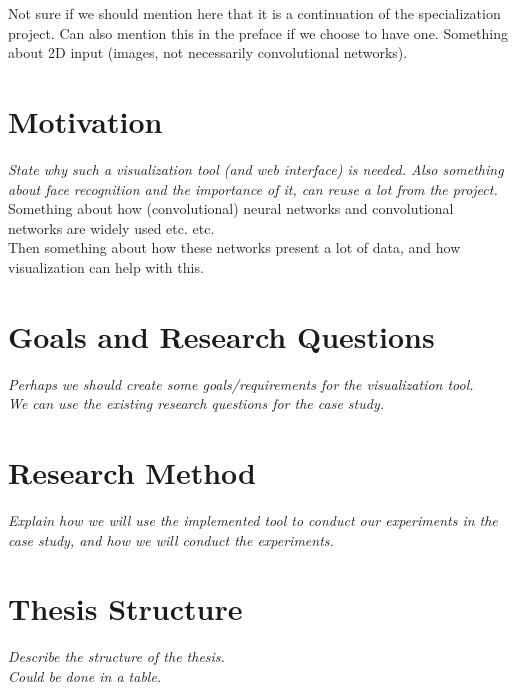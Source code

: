 \noindent Not sure if we should mention here that it is a continuation of the specialization project. Can also mention this in the preface if we choose to have one.
\noindent Something about 2D input (images, not necessarily convolutional networks).

\section{Motivation}

\textit{State why such a visualization tool (and web interface) is needed. Also something about face recognition and the importance of it, can reuse a lot from the project.} \\

\noindent Something about how (convolutional) neural networks and convolutional networks are widely used etc. etc. \\

\noindent Then something about how these networks present a lot of data, and how visualization can help with this.

\section{Goals and Research Questions}

\textit{Perhaps we should create some goals/requirements for the visualization tool. \\
We can use the existing research questions for the case study.}

\section{Research Method}

\textit{Explain how we will use the implemented tool to conduct our experiments in the case study, and how we will conduct the experiments.}

\section{Thesis Structure}

\textit{Describe the structure of the thesis. \\
Could be done in a table.}

\cleardoublepage